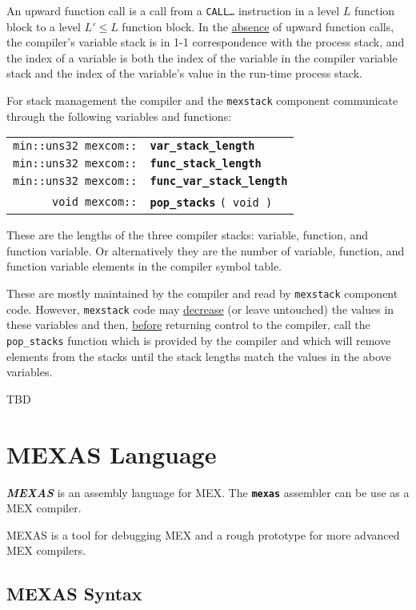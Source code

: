 \documentclass[12pt]{article}
\makeatletter
\newcommand{\TT}[1]{{\tt \bfseries #1}}
\newcommand{\key}[1]{{\bf \em #1}\index{#1}}
\newcommand{\ttkey}[1]{\TT{#1}\index{#1@{\tt #1}}}
\newcommand{\ttindex}[1]{\index{#1@{\tt #1}}}
\newenvironment{indpar}[1][0.3in]%
	{\begin{list}{}%
		     {\setlength{\itemsep}{0in}%
		      \setlength{\topsep}{0in}%
		      \setlength{\parsep}{1ex}%
		      \setlength{\labelwidth}{#1}%
		      \setlength{\leftmargin}{#1}%
		      \addtolength{\leftmargin}{\labelsep}}%
	 \item}%
	{\end{list}}
\newcommand{\MEXCOMKEY}[1]%
	   {\TT{#1}\ttindex{mexcom::#1}\ttindex{#1}}
\makeatother
\begin{document}
An upward function call is a call from a {\tt CALL\ldots} instruction in
a level $L$ function block to a level $L'\leq L$ function block.
In the \underline{absence} of upward function calls,
the compiler's variable stack
is in 1-1 correspondence with the process stack, and the index of a
variable is both the index of the variable in the compiler variable stack
and the index of the variable's value in the run-time process stack.

For stack management the compiler and the {\tt mexstack} component
communicate through the following variables and functions:

\begin{tabular}{@{}r@{~~~}l}
\verb|min::uns32 mexcom::| & \MEXCOMKEY{var\_stack\_length} \\
\verb|min::uns32 mexcom::| & \MEXCOMKEY{func\_stack\_length} \\
\verb|min::uns32 mexcom::| & \MEXCOMKEY{func\_var\_stack\_length} \\
\verb|void mexcom::| & \MEXCOMKEY{pop\_stacks} {\tt ( void )}
\end{tabular}

\begin{indpar}
These are the lengths of the three compiler stacks: variable, function,
and function variable.  Or alternatively they are the number of
variable, function, and function variable elements in the compiler
symbol table.

These are mostly maintained by the compiler and read by {\tt mexstack}
component code.  However, {\tt mexstack} code may \underline{decrease}
(or leave untouched) the values in these variables and then,
\underline{before} returning control to the compiler, call the
{\tt pop\_stacks} function which is provided by the compiler and which
will remove elements from the stacks until the stack lengths match
the values in the above variables.
\end{indpar}


TBD

\section{MEXAS Language}
\label{MEXAS Language}

\key{MEXAS} is an assembly language for MEX.  The \ttkey{mexas}
assembler can be use as a MEX compiler.

MEXAS is a tool for debugging MEX and a rough prototype for more
advanced MEX compilers.

\subsection{MEXAS Syntax}
\label{MEXAS-SYNTAX}
\end{document}
